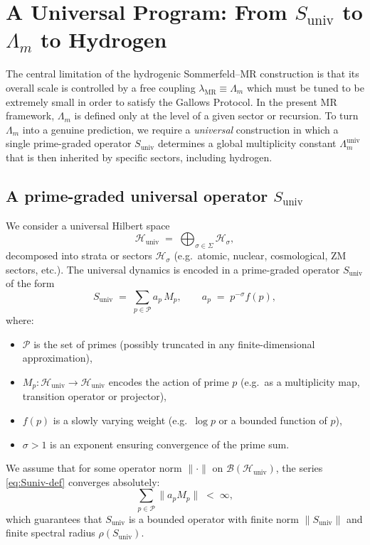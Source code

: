 \documentclass[11pt,a4paper]{article}
\newcommand{\LambdaM}{\Lambda_{m}}
\newcommand{\LambdaMuniv}{\Lambda_{m}^{\mathrm{univ}}}
\newcommand{\lamMR}{\lambda_{\mathrm{MR}}}
\begin{document}
\section{A Universal Program: From $S_{\text{univ}}$ to $\Lambda_m$ to Hydrogen}
\label{sec:universal}

The central limitation of the hydrogenic Sommerfeld--MR construction is
that its overall scale is controlled by a free coupling
$\lamMR \equiv \LambdaM$ which must be tuned to be extremely small in
order to satisfy the Gallows Protocol. In the present MR framework,
$\LambdaM$ is defined only at the level of a given sector or recursion.
To turn $\LambdaM$ into a genuine prediction, we require a
\emph{universal} construction in which a single prime-graded operator
$S_{\text{univ}}$ determines a global multiplicity constant
$\LambdaMuniv$ that is then inherited by specific sectors, including
hydrogen.

\subsection{A prime-graded universal operator $S_{\text{univ}}$}

We consider a universal Hilbert space
\begin{equation}
  \mathcal{H}_{\text{univ}}
  \;=\;
  \bigoplus_{\sigma \in \Sigma}
  \mathcal{H}_{\sigma},
\end{equation}
decomposed into strata or sectors
$\mathcal{H}_{\sigma}$ (e.g.\ atomic, nuclear, cosmological, ZM sectors,
etc.). The universal dynamics is encoded in a prime-graded operator
$S_{\text{univ}}$ of the form
\begin{equation}
  S_{\text{univ}}
  \;=\;
  \sum_{p \in \mathcal{P}}
  a_p\, M_p,
  \qquad
  a_p \;=\; p^{-\sigma} f(p),
  \label{eq:Suniv-def}
\end{equation}
where:
\begin{itemize}
  \item $\mathcal{P}$ is the set of primes (possibly truncated in any
    finite-dimensional approximation),
  \item $M_p : \mathcal{H}_{\text{univ}} \to \mathcal{H}_{\text{univ}}$
    encodes the action of prime $p$ (e.g.\ as a multiplicity map,
    transition operator or projector),
  \item $f(p)$ is a slowly varying weight (e.g.\ $\log p$ or a bounded
    function of $p$),
  \item $\sigma > 1$ is an exponent ensuring convergence of the prime
    sum.
\end{itemize}
We assume that for some operator norm $\|\cdot\|$ on
$\mathcal{B}(\mathcal{H}_{\text{univ}})$, the series
\eqref{eq:Suniv-def} converges absolutely:
\begin{equation}
  \sum_{p \in \mathcal{P}} \|a_p M_p\|
  \;<\; \infty,
\end{equation}
which guarantees that $S_{\text{univ}}$ is a bounded operator with
finite norm $\|S_{\text{univ}}\|$ and finite spectral radius
$\rho(S_{\text{univ}})$.
\end{document}
